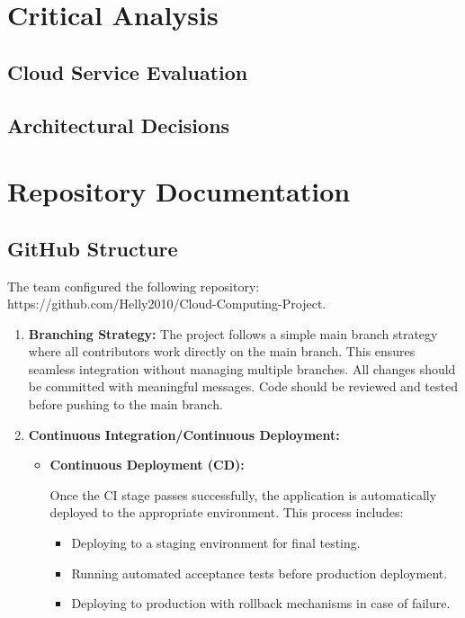 \documentclass{llncs}
\begin{document}
\newpage

\section{Critical Analysis}
\subsection{Cloud Service Evaluation}

\subsection{Architectural Decisions}


\section{Repository Documentation}
\subsection{GitHub Structure}

The team configured the following repository: https://github.com/Helly2010/Cloud-Computing-Project.

\begin{enumerate}
    \item \textbf{Branching Strategy:} \newline
          The project follows a simple main branch strategy where all contributors work directly on the main branch.
          This ensures seamless integration without managing multiple branches. All changes should be committed with meaningful messages.
          Code should be reviewed and tested before pushing to the main branch.

    \item \textbf{Continuous Integration/Continuous Deployment:}
          \begin{itemize}
              \item \textbf{Continuous Deployment (CD):}

                    Once the CI stage passes successfully, the application is automatically deployed to the appropriate environment. This process includes:
                    \begin{itemize}
                        \item Deploying to a staging environment for final testing.
                        \item Running automated acceptance tests before production deployment.
                        \item Deploying to production with rollback mechanisms in case of failure.
                    \end{itemize}

          \end{itemize}
\end{enumerate}
\newpage
\end{document}
